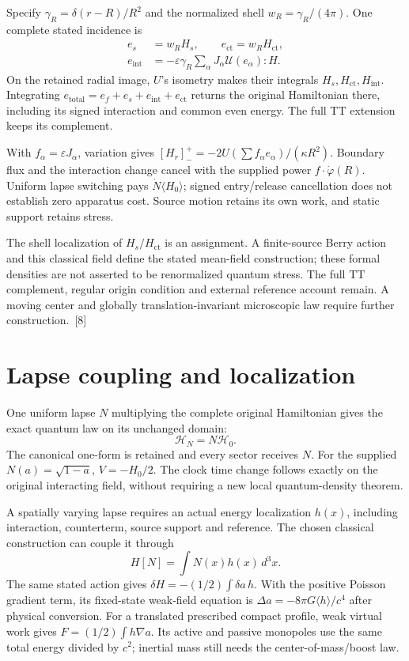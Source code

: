 \documentclass[10pt,twocolumn,letterpaper]{article}
\begin{document}
Specify $\gamma_R=\delta(r-R)/R^2$ and the normalized shell $w_R=\gamma_R/(4\pi)$. One complete stated incidence is
\[
\begin{aligned}
e_s&=w_RH_s,\qquad e_{\mathrm{ct}}=w_RH_{\mathrm{ct}},\\
e_{\mathrm{int}}&=-\varepsilon\gamma_R\sum_\alpha J_\alpha\mathcal U(e_\alpha):H.
\end{aligned}
\]
On the retained radial image, $U$'s isometry makes their integrals $H_s,H_{\mathrm{ct}},H_{\mathrm{int}}$. Integrating $e_{\mathrm{total}}=e_f+e_s+e_{\mathrm{int}}+e_{\mathrm{ct}}$ returns the original Hamiltonian there, including its signed interaction and common even energy. The full TT extension keeps its complement.

With $f_\alpha=\varepsilon J_\alpha$, variation gives $[H_r]^+_-=-2U(\sum f_\alpha e_\alpha)/(\kappa R^2)$. Boundary flux and the interaction change cancel with the supplied power $f\cdot\dot\varphi(R)$. Uniform lapse switching pays $\dot N\langle H_0\rangle$; signed entry/release cancellation does not establish zero apparatus cost. Source motion retains its own work, and static support retains stress.

The shell localization of $H_s/H_{\mathrm{ct}}$ is an assignment. A finite-source Berry action and this classical field define the stated mean-field construction; these formal densities are not asserted to be renormalized quantum stress. The full TT complement, regular origin condition and external reference account remain. A moving center and globally translation-invariant microscopic law require further construction.~[8]

\section{Lapse coupling and localization}
One uniform lapse $N$ multiplying the complete original Hamiltonian gives the exact quantum law on its unchanged domain:
\[
\mathcal H_N=N\mathcal H_0.
\]
The canonical one-form is retained and every sector receives $N$. For the supplied $N(a)=\sqrt{1-a}$, $V=-H_0/2$. The clock time change follows exactly on the original interacting field, without requiring a new local quantum-density theorem.

A spatially varying lapse requires an actual energy localization $h(x)$, including interaction, counterterm, source support and reference. The chosen classical construction can couple it through
\[
H[N]=\int N(x)h(x)\,d^3x.
\]
The same stated action gives $\delta H=-(1/2)\int\delta a\,h$. With the positive Poisson gradient term, its fixed-state weak-field equation is $\Delta a=-8\pi G\langle h\rangle/c^4$ after physical conversion. For a translated prescribed compact profile, weak virtual work gives $F=(1/2)\int h\nabla a$. Its active and passive monopoles use the same total energy divided by $c^2$; inertial mass still needs the center-of-mass/boost law.
\end{document}
